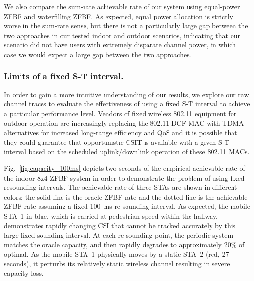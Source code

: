 	We also compare the sum-rate achievable rate of our system using equal-power \ac{ZFBF} and waterfilling \ac{ZFBF}.
	As expected, equal power allocation is strictly worse in the sum-rate sense, but there is not a particularly large gap between the two approaches in our tested indoor and outdoor scenarios, indicating that our scenario did not have users with extremely disparate channel power, in which case we would expect a large gap between the two approaches.


\subsubsection{Limits of a fixed S-T interval.}
\label{sec:static_interval}
		In order to gain a more intuitive understanding of our results, we explore our raw channel traces to evaluate the effectiveness of using a fixed S-T interval to achieve a particular performance level.
	Vendors of fixed wireless 802.11 equipment for outdoor operation are increasingly replacing the 802.11 DCF MAC with \ac{TDMA} alternatives for increased long-range efficiency and QoS \cite{unni2015performance} and it is possible that they could guarantee that opportunistic \ac{CSIT} is available with a given S-T interval based on the scheduled uplink/downlink operation of these 802.11 \acp{MAC}. 

 Fig.~\ref{fig:capacity_100ms} depicts two seconds of the empirical achievable rate of the indoor 8x4 \ac{ZFBF} system in order to demonstrate the problem of using fixed resounding intervals.
 The achievable rate of three \acp{STA} are shown in different colors; the solid line is the oracle \ac{ZFBF} rate and the dotted line is the achievable \ac{ZFBF} rate assuming a fixed 100~ms re-sounding interval.
 As expected, the mobile \ac{STA}~1 in blue, which is carried at pedestrian speed within the hallway, demonstrates rapidly changing \ac{CSI} that cannot be tracked accurately by this large fixed sounding interval.
 At each re-sounding point, the periodic system matches the oracle capacity, and then rapidly degrades to approximately 20\% of optimal.
 As the mobile \ac{STA}~1 physically moves by a static \ac{STA}~2 (red, 27 seconds), it perturbs its relatively static wireless channel resulting in severe capacity loss.
 
